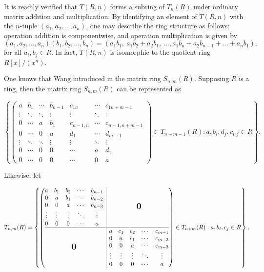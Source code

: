 \documentclass[12pt]{amsart}
\theoremstyle{definition}
\newcommand{\bigzero}{\mbox{\normalfont\Large\bfseries 0}}
\begin{document}
It is readily verified that \(T(R,n)\) forms a subring of $T_n(R)$ under ordinary matrix addition and multiplication. By identifying an element of \(T(R,n)\) with the \(n\)-tuple \((a_1, a_2, \dots, a_n)\), one may describe the ring structure as follows: operation addition is componentwise, and operation multiplication is given by
\[
(a_1, a_2, \dots, a_n)(b_1, b_2, \dots, b_n) = (a_1b_1,\ a_1b_2 + a_2b_1,\ \dots,a_1b_n+a_2b_{n-1}+\dots+a_nb_1),
\]
for all \(a_i, b_j \in R\). In fact, \(T(R,n)\) is isomorphic to the quotient ring \(R[x]/(x^n)\).

\medskip

One knows that Wang introduced in \cite{wang} the matrix ring $S_{n,m}(R)$. Supposing $R$ is a ring, then the matrix ring $S_{n,m}(R)$ can be represented as

$$\left\{\begin{pmatrix}
	a & b_1 & \cdots & b_{n-1} & c_{1n} & \cdots & c_{1 n+m-1}\\
	\vdots  & \ddots & \ddots & \vdots & \vdots & \ddots & \vdots \\
	0 & \cdots & a & b_1 & c_{n-1,n} & \cdots & c_{n-1,n+m-1} \\
	0 & \cdots & 0 & a & d_1 & \cdots & d_{m-1} \\
	\vdots  & \ddots & \ddots & \vdots & \vdots & \ddots & \vdots \\
	0 & \cdots & 0 & 0  & \cdots & a & d_1 \\
	0 & \cdots & 0 & 0  & \cdots & 0 & a
\end{pmatrix}\in T_{n+m-1}(R) : a, b_i, d_j,c_{i,j} \in R \right\}.$$

Likewise, let 

$$T_{n,m}(R)=\left\{ \left(\begin{array}{@{}c|c@{}}
	\begin{matrix}
		a & b_1 & b_2 & \cdots & b_{n-1} \\
		0 & a & b_1 & \cdots & b_{n-2} \\
		0 & 0 & a & \cdots & b_{n-3} \\
		\vdots & \vdots & \vdots & \ddots & \vdots \\
		0 & 0 & 0 & \cdots & a
	\end{matrix}
	& \bigzero \\
	\hline
	\bigzero &
	\begin{matrix}
		a & c_1 & c_2 & \cdots & c_{m-1} \\
		0 & a & c_1 & \cdots & c_{m-2} \\
		0 & 0 & a & \cdots & c_{m-3} \\
		\vdots & \vdots & \vdots & \ddots & \vdots \\
		0 & 0 & 0 & \cdots & a
	\end{matrix}
\end{array}\right)\in T_{n+m}(R) : a, b_i,c_j \in R \right\},$$
\end{document}
